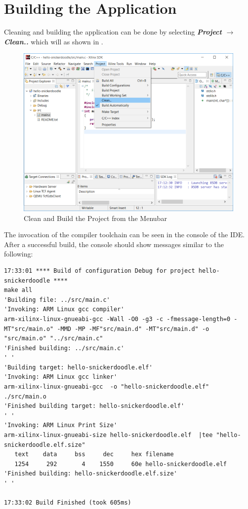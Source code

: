 \section{Building the Application}

Cleaning and building the application can be done by selecting \textit{\bfseries Project $\rightarrow$ Clean..} which will  as shown in . \\

\begin{figure}[h]
	\centering
	\includegraphics{images/Clean_Project.png}
	\caption{Clean and Build the Project from the Menubar}
	\label{fig:cleanbuild}
\end{figure}


\noindent
The invocation of the compiler toolchain can be seen in the console of the IDE. After a successful build, the console should show messages similar to the following: 

\begin{fullwidth}
\begin{lstlisting}[style=text,backgroundcolor=\color{white}]
17:33:01 **** Build of configuration Debug for project hello-snickerdoodle ****
make all 
'Building file: ../src/main.c'
'Invoking: ARM Linux gcc compiler'
arm-xilinx-linux-gnueabi-gcc -Wall -O0 -g3 -c -fmessage-length=0 -MT"src/main.o" -MMD -MP -MF"src/main.d" -MT"src/main.d" -o "src/main.o" "../src/main.c"
'Finished building: ../src/main.c'
' '
'Building target: hello-snickerdoodle.elf'
'Invoking: ARM Linux gcc linker'
arm-xilinx-linux-gnueabi-gcc  -o "hello-snickerdoodle.elf"  ./src/main.o   
'Finished building target: hello-snickerdoodle.elf'
' '
'Invoking: ARM Linux Print Size'
arm-xilinx-linux-gnueabi-size hello-snickerdoodle.elf  |tee "hello-snickerdoodle.elf.size"
   text	   data	    bss	    dec	    hex	filename
   1254	    292	      4	   1550	    60e	hello-snickerdoodle.elf
'Finished building: hello-snickerdoodle.elf.size'
' '

17:33:02 Build Finished (took 605ms)
\end{lstlisting}
\end{fullwidth}

